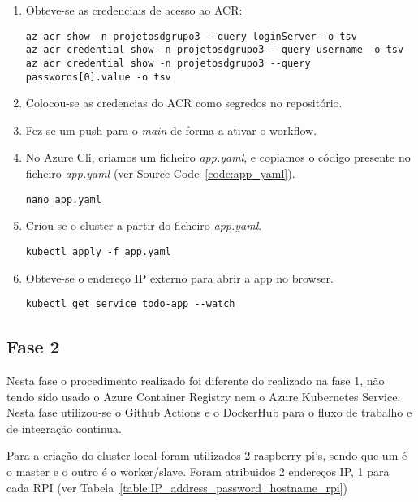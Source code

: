 \begin{enumerate}
        \item Obteve-se as credenciais de acesso ao ACR:

        \begin{verbatim}
az acr show -n projetosdgrupo3 --query loginServer -o tsv
az acr credential show -n projetosdgrupo3 --query username -o tsv
az acr credential show -n projetosdgrupo3 --query passwords[0].value -o tsv
        \end{verbatim}

        \item Colocou-se as credencias do ACR como segredos no repositório.
        \item Fez-se um push para o \emph{main} de forma a ativar o workflow.
        \item No Azure Cli, criamos um ficheiro \emph{app.yaml}, e copiamos o código presente no ficheiro \emph{app.yaml} (ver Source Code~\ref{code:app_yaml}).

        \begin{verbatim}
nano app.yaml
        \end{verbatim}

        \item Criou-se o cluster a partir do ficheiro \emph{app.yaml}.

        \begin{verbatim}
kubectl apply -f app.yaml
        \end{verbatim}

        \item Obteve-se o endereço IP externo para abrir a app no browser.

        \begin{verbatim}
kubectl get service todo-app --watch
        \end{verbatim}

    \end{enumerate}




\subsection{Fase 2}

    \par Nesta fase o procedimento realizado foi diferente do realizado na fase 1, não tendo sido usado o Azure Container Registry nem o Azure Kubernetes Service. Nesta fase utilizou-se o Github Actions e o DockerHub para o fluxo de trabalho e de integração continua.
    \par Para a criação do cluster local foram utilizados 2 raspberry pi's, sendo que um é o master e o outro é o worker/slave. Foram atribuidos 2 endereços IP, 1 para cada RPI (ver Tabela~\ref{table:IP_address_password_hostname_rpi})

